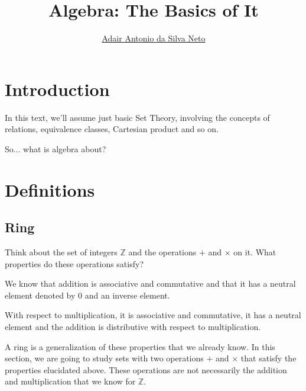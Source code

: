 \documentclass[12pt,a4paper]{article}
\author{\href{https://adairneto.github.io/}{Adair Antonio da Silva Neto}}
\title{Algebra: The Basics of It}
\begin{document}
\clearpage\maketitle
\thispagestyle{empty}

\newpage

\tableofcontents

\newpage
\clearpage
\setcounter{page}{1}

\section{Introduction}

In this text, we'll assume just basic Set Theory, involving the concepts of relations, equivalence classes, Cartesian product and so on.

So... what is algebra about?



\section{Definitions}

\subsection{Ring}\label{ring}

Think about the set of integers \(\mathbb{Z} \) and the operations \(+\) and \(\times\) on it. What properties do these operations satisfy?

We know that addition is associative and commutative and that it has a neutral element denoted by \(0\) and an inverse element.

With respect to multiplication, it is associative and commutative, it has a neutral element and the addition is distributive with respect to multiplication.

A ring is a generalization of these properties that we already know. In this section, we are going to study sets with two operations \(+\) and \(\times\) that satisfy the properties elucidated above. These operations are not necessarily the addition and multiplication that we know for \(\mathbb{Z}\).
\end{document}
